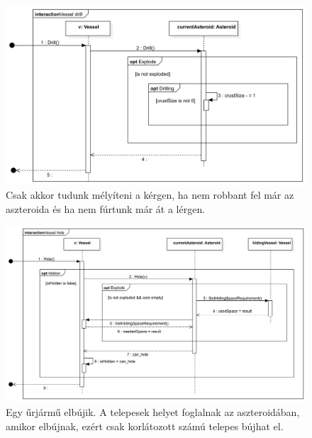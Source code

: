 \begin{figure}[H] 
\centering 
\includegraphics[width=1\textwidth]{docs/3_Project/svg/Design Model!Vessel Actions!Vessel drill!Vessel drill_10.png} 
\caption{Csak akkor tudunk mélyíteni a kérgen, ha nem robbant fel már az aszteroida és ha nem fúrtunk már át a lérgen.} 
\end{figure} 

\begin{figure}[H] 
\centering 
\includegraphics[width=1\textwidth]{docs/3_Project/svg/Design Model!Vessel Actions!Vessel hide!Vessel hide_11.png} 
\caption{Egy űrjármű elbújik. A telepesek helyet foglalnak az aszteroidában, amikor elbújnak, ezért csak korlátozott számú telepes bújhat el.} 
\end{figure} 

